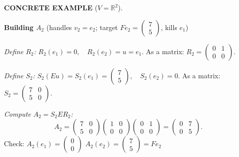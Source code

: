 \documentclass[12pt]{article}
\theoremstyle{mythmstyle}
\newenvironment{example}{%
  \vspace{8pt}
  \begin{mdframed}[backgroundcolor=examplebg, linecolor=exampleblue,
    linewidth=1.4pt, innerleftmargin=14pt, innerrightmargin=14pt,
    innertopmargin=12pt, innerbottommargin=12pt,
    skipabove=12pt, skipbelow=12pt]
  \noindent\textcolor{exampleblue}{\textbf{\small CONCRETE EXAMPLE} \normalsize($V = \mathbb{R}^2$).}\par\vspace{6pt}
}{%
  \end{mdframed}
  \vspace{6pt}
}
\begin{document}
\begin{example}
\vspace{14pt}

\noindent\textbf{Building $A_2$} \quad (handles $v_2 = e_2$;
target $Fe_2 = \begin{pmatrix}7\\5\end{pmatrix}$, kills $e_1$)

\vspace{6pt}

\noindent\emph{Define $R_2$:} \quad
$R_2(e_1) = 0,\quad R_2(e_2) = u = e_1.$ \quad
As a matrix: $R_2 = \begin{pmatrix}0&1\\0&0\end{pmatrix}$.

\vspace{4pt}

\noindent\emph{Define $S_2$:} \quad
$S_2(Eu) = S_2(e_1) = \begin{pmatrix}7\\5\end{pmatrix},\quad S_2(e_2) = 0.$ \quad
As a matrix: $S_2 = \begin{pmatrix}7&0\\5&0\end{pmatrix}$.

\vspace{4pt}

\noindent\emph{Compute $A_2 = S_2 E R_2$:}
\[
    A_2 =
    \begin{pmatrix}7&0\\5&0\end{pmatrix}
    \begin{pmatrix}1&0\\0&0\end{pmatrix}
    \begin{pmatrix}0&1\\0&0\end{pmatrix}
    =
    \begin{pmatrix}0&7\\0&5\end{pmatrix}.
\]
\noindent Check: \;
$A_2(e_1) = \begin{pmatrix}0\\0\end{pmatrix}$ \checkmark \qquad
$A_2(e_2) = \begin{pmatrix}7\\5\end{pmatrix} = Fe_2$ \checkmark
\end{example}
\end{document}
